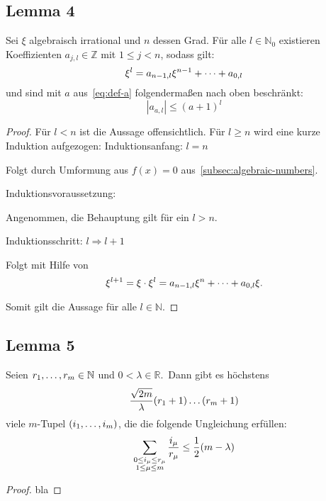 \subsection{Lemma 4}
    \label{subsec:lemma4}
    \textrm{Sei $\xi$ algebraisch irrational und $n$ dessen Grad. Für alle $l \in \mathbb{N}_0$ existieren
    Koeffizienten $a_{j,l} \in \mathbb{Z}$ mit $1 \leq j < n$, sodass gilt:}
    \begin{equation*}
        \xi^l = a_{n-1, l}\xi^{n-1} + \dots + a_{0,l}
    \end{equation*}
    \textrm{und sind mit $a$ aus~\eqref{eq:def-a} folgendermaßen nach oben beschränkt:}
    \begin{equation*}
        \left| a_{a,l} \right| \leq (a + 1)^l
    \end{equation*}
    \begin{proof}
        \textrm{Für $l < n$ ist die Aussage offensichtlich. Für $l \geq n$ wird eine kurze Induktion aufgezogen:}
        \newpage
        Induktionsanfang: $l = n$
        \begin{indentpar}
            Folgt durch Umformung aus $f(x) = 0$ aus~\ref{subsec:algebraic-numbers}.
        \end{indentpar}
        Induktionsvoraussetzung:
        \begin{indentpar}
            \textrm{Angenommen, die Behauptung gilt für ein $l > n$.}
        \end{indentpar}
        Induktionsschritt: $l \Rightarrow l+1$
        \begin{indentpar}
            Folgt mit Hilfe von
            \begin{equation*}
                \xi^{l+1} = \xi \cdot \xi^l = a_{n-1, l}\xi^{n} + \dots + a_{0,l} \xi.
            \end{equation*}
        \end{indentpar}
        \textrm{Somit gilt die Aussage für alle $l \in \mathbb{N}$.}
    \end{proof}

\subsection{Lemma 5}
    \label{subsec:lemma5}
    \textrm{Seien $r_1, \dots, r_m \in \mathbb{N}$ und $0 < \lambda \in \mathbb{R}$.\ Dann gibt es höchstens}
    \begin{equation*}
        \frac{\sqrt{2m}}{\lambda} (r_1 + 1) \dots (r_m +1)
    \end{equation*}
    \textrm{viele $m$-Tupel $(i_1, \dots, i_m)$, die die folgende Ungleichung erfüllen:}
    \begin{equation*}
        \sum_{\substack{0 \leq i_\mu \leq r_\mu \\ 1 \leq \mu \leq m}} \frac{i_\mu}{r_\mu} \leq \frac{1}{2} (m - \lambda)
    \end{equation*}
    \begin{proof}
        bla \shine
    \end{proof}
    
